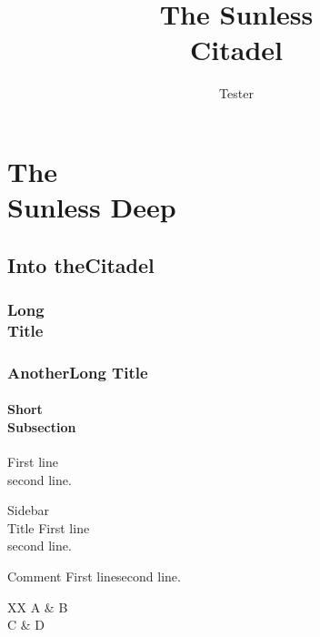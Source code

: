 \documentclass[nodeprecatedcode]{dndbook}
\title{The Sunless\\Citadel}
\author{Tester}
\begin{document}
\maketitle
\tableofcontents

\part{The\\Sunless Deep}
\chapter{Into the\newline Citadel}
\section{Long\\Title}
\section{Another\newline Long Title}
\subsection{Short\\Subsection}

\begin{DndReadAloud}
  First line\\second line.
\end{DndReadAloud}

\begin{DndSidebar}{Sidebar\\Title}
  First line\\second line.
\end{DndSidebar}

\begin{DndComment}{Comment}
  First line\newline second line.
\end{DndComment}

\begin{DndTable}{XX}
  A & B \\
  C & D
\end{DndTable}
\end{document}
